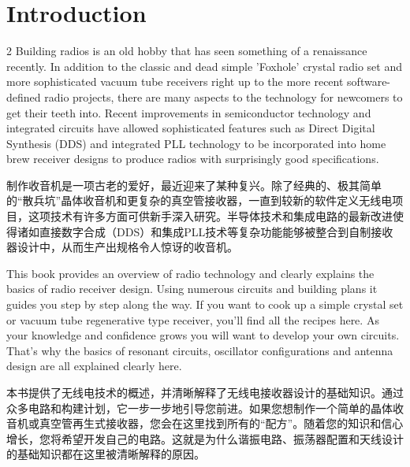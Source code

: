 \documentclass{ctexbook}
\begin{document}
\chapter{Introduction}
\begin{paracol}{2}
\setlength{\columnsep}{2em}
Building radios is an old hobby that has seen something of a renaissance recently. In 
addition to the classic and dead simple 'Foxhole' crystal radio set and more sophisticated vacuum tube receivers right up to the more recent software-defined radio projects, 
there are many aspects to the technology for newcomers to get their teeth into. Recent 
improvements in semiconductor technology and integrated circuits have allowed sophisticated features such as Direct Digital Synthesis (DDS) and integrated PLL technology to 
be incorporated into home brew receiver designs to produce radios with surprisingly good 
specifications. 

\switchcolumn

制作收音机是一项古老的爱好，最近迎来了某种复兴。除了经典的、极其简单的“散兵坑”晶体收音机和更复杂的真空管接收器，一直到较新的软件定义无线电项目，这项技术有许多方面可供新手深入研究。半导体技术和集成电路的最新改进使得诸如直接数字合成（DDS）和集成PLL技术等复杂功能能够被整合到自制接收器设计中，从而生产出规格令人惊讶的收音机。

\switchcolumn*

This book provides an overview of radio technology and clearly explains the basics of radio receiver design. Using numerous circuits and building plans it guides you step by step 
along the way. If you want to cook up a simple crystal set or vacuum tube regenerative 
type receiver, you'll find all the recipes here. As your knowledge and confidence grows you 
will want to develop your own circuits. That's why the basics of resonant circuits, oscillator 
configurations and antenna design are all explained clearly here. 

\switchcolumn

本书提供了无线电技术的概述，并清晰解释了无线电接收器设计的基础知识。通过众多电路和构建计划，它一步一步地引导您前进。如果您想制作一个简单的晶体收音机或真空管再生式接收器，您会在这里找到所有的“配方”。随着您的知识和信心增长，您将希望开发自己的电路。这就是为什么谐振电路、振荡器配置和天线设计的基础知识都在这里被清晰解释的原因。

\switchcolumn*


\end{paracol}
\end{document}

